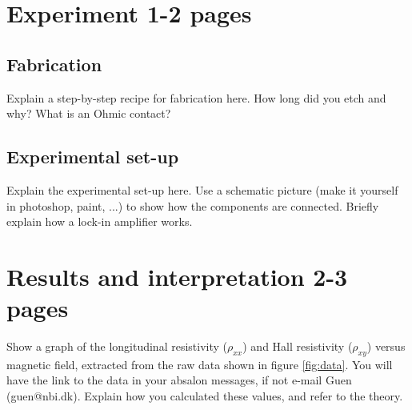 \documentclass[a4paper]{article}
\begin{document}
%


%
%
%
%
%
%
%
%

\newpage





























\iffalse
\section{Experiment 1-2 pages}
\subsection{Fabrication}
Explain a step-by-step recipe for fabrication here. How long did you etch and why? What is an Ohmic contact?
\subsection{Experimental set-up}
Explain the experimental set-up here. Use a schematic picture (make it yourself in photoshop, paint, ...) to show how the components are connected. Briefly explain how a lock-in amplifier works.

\section{Results and interpretation 2-3 pages}
Show a graph of the longitudinal resistivity ($\rho_{xx}$) and Hall resistivity ($\rho_{xy}$) versus magnetic field, extracted from the raw data shown in figure \ref{fig:data}. You will have the link to the data in your absalon messages, if not e-mail Guen (guen@nbi.dk). Explain how you calculated these values, and refer to the theory.
\end{document}

